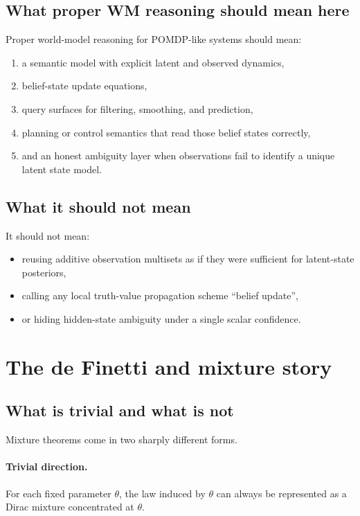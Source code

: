 \documentclass[11pt]{article}
\newcommand{\wm}{world-model}
\begin{document}
\subsection{What proper WM reasoning should mean here}

Proper \wm{} reasoning for POMDP-like systems should mean:
\begin{enumerate}
  \item a semantic model with explicit latent and observed dynamics,
  \item belief-state update equations,
  \item query surfaces for filtering, smoothing, and prediction,
  \item planning or control semantics that read those belief states correctly,
  \item and an honest ambiguity layer when observations fail to identify a
        unique latent state model.
\end{enumerate}

\subsection{What it should not mean}

It should not mean:
\begin{itemize}
  \item reusing additive observation multisets as if they were sufficient for
        latent-state posteriors,
  \item calling any local truth-value propagation scheme ``belief update'',
  \item or hiding hidden-state ambiguity under a single scalar confidence.
\end{itemize}

\section{The de Finetti and mixture story}

\subsection{What is trivial and what is not}

Mixture theorems come in two sharply different forms.

\paragraph{Trivial direction.}
For each fixed parameter $\theta$, the law induced by $\theta$ can always be
represented as a Dirac mixture concentrated at $\theta$.
\end{document}
